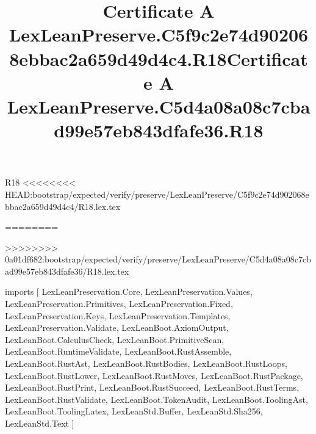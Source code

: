 \begin{lexlean}{R18}
<<<<<<<< HEAD:bootstrap/expected/verify/preserve/LexLeanPreserve/C5f9c2e74d902068ebbac2a659d49d4c4/R18.lex.tex
\title{Certificate A LexLeanPreserve.C5f9c2e74d902068ebbac2a659d49d4c4.R18}
========
\title{Certificate A LexLeanPreserve.C5d4a08a08c7cbad99e57eb843dfafe36.R18}
>>>>>>>> 0a01df682:bootstrap/expected/verify/preserve/LexLeanPreserve/C5d4a08a08c7cbad99e57eb843dfafe36/R18.lex.tex
\begin{coremodule}
imports [
  LexLeanPreservation.Core,
  LexLeanPreservation.Values,
  LexLeanPreservation.Primitives,
  LexLeanPreservation.Fixed,
  LexLeanPreservation.Keys,
  LexLeanPreservation.Templates,
  LexLeanPreservation.Validate,
  LexLeanBoot.AxiomOutput,
  LexLeanBoot.CalculusCheck,
  LexLeanBoot.PrimitiveScan,
  LexLeanBoot.RuntimeValidate,
  LexLeanBoot.RustAssemble,
  LexLeanBoot.RustAst,
  LexLeanBoot.RustBodies,
  LexLeanBoot.RustLoops,
  LexLeanBoot.RustLower,
  LexLeanBoot.RustMoves,
  LexLeanBoot.RustPackage,
  LexLeanBoot.RustPrint,
  LexLeanBoot.RustSucceed,
  LexLeanBoot.RustTerms,
  LexLeanBoot.RustValidate,
  LexLeanBoot.TokenAudit,
  LexLeanBoot.ToolingAst,
  LexLeanBoot.ToolingLatex,
  LexLeanStd.Buffer,
  LexLeanStd.Sha256,
  LexLeanStd.Text
]


\end{coremodule}
\end{lexlean}
